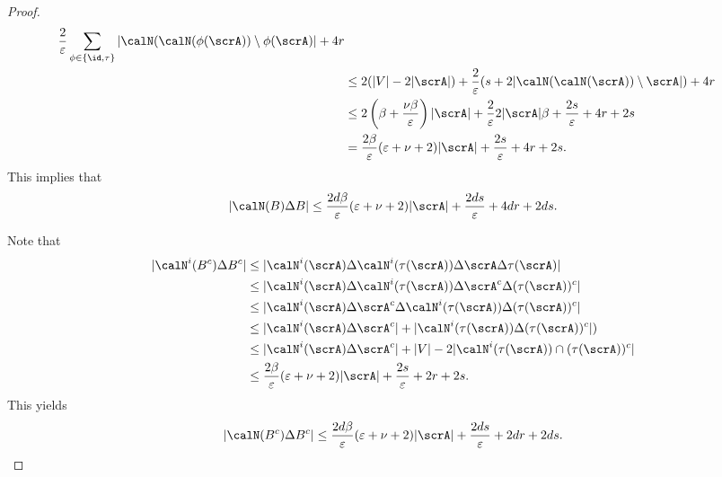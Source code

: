 \begin{proof}
\begin{align*}
\frac 2\varepsilon\sum_{\phi\in \{\id, \tau\}} |\calN(\calN(\phi(\scrA)) \setminus \phi(\scrA)| + 4r\\
& \leq 2(|V| - 2|\scrA|) + 
\frac 2\varepsilon (s+ 2 |\calN(\calN(\scrA)) \setminus \scrA| ) + 4r\\
& \leq 2\left(\beta + \frac{\nu\beta}\varepsilon \right)|\scrA| +\frac 2\varepsilon 2|\scrA|\beta + \frac {2s}\varepsilon   + 4r + 2s\\
& =  \frac{2\beta}\varepsilon (\varepsilon + \nu + 2)|\scrA| + \frac {2s}\varepsilon  + 4r + 2s.
\end{align*}
This implies that 
$$
|\calN(B) \Delta B|
\leq 
\frac{2d\beta}\varepsilon (\varepsilon + \nu + 2)|\scrA| +  \frac {2ds}\varepsilon  + 4dr + 2ds.
$$

Note that 
\begin{align*}
|\calN^i(B^c) \Delta B^c| 
& \leq |\calN^i(\scrA) \Delta \calN^i(\tau(\scrA)) \Delta \scrA \Delta\tau(\scrA)| \\
& \leq |\calN^i(\scrA) \Delta \calN^i(\tau(\scrA)) \Delta \scrA^c \Delta (\tau(\scrA))^c| \\
& \leq |\calN^i(\scrA) \Delta \scrA^c \Delta \calN^i(\tau(\scrA)) \Delta (\tau(\scrA))^c| \\
& \leq |\calN^i(\scrA) \Delta \scrA^c| + |\calN^i(\tau(\scrA)) \Delta (\tau(\scrA))^c| )\\
& \leq |\calN^i(\scrA) \Delta \scrA^c| + |V| - 2 |\calN^i(\tau(\scrA)) \cap (\tau(\scrA))^c| \\
& \leq \frac{2\beta}\varepsilon (\varepsilon + \nu + 2)|\scrA| + \frac {2s}\varepsilon  + 2r + 2s.
\end{align*}
This yields 
$$
|\calN(B^c) \Delta B^c|
\leq 
\frac{2d\beta}\varepsilon (\varepsilon + \nu + 2)|\scrA| + \frac {2ds}\varepsilon +  2dr + 2ds.
$$


\end{proof}
